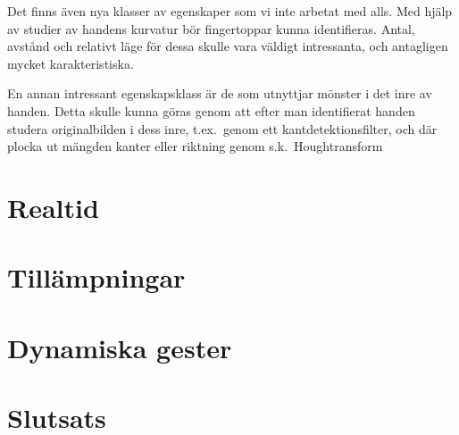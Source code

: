 \documentclass[../rapport_MVEX01-11-05]{subfiles}
\begin{document}
Det finns även nya klasser av egenskaper som vi inte arbetat med
alls. Med hjälp av studier av handens kurvatur bör fingertoppar kunna
identifieras. Antal, avstånd och relativt läge för dessa skulle vara
väldigt intressanta, och antagligen mycket karakteristiska.

En annan intressant egenskapsklass är de som utnyttjar mönster i det
inre av handen. Detta skulle kunna göras
genom att efter man identifierat handen studera originalbilden i dess
inre, t.ex.~genom ett kantdetektionsfilter, och där plocka ut mängden
kanter eller riktning genom s.k.~Houghtransform

\section{Realtid}
\section{Tillämpningar}
\section{Dynamiska gester}





\section{Slutsats}
\end{document}

